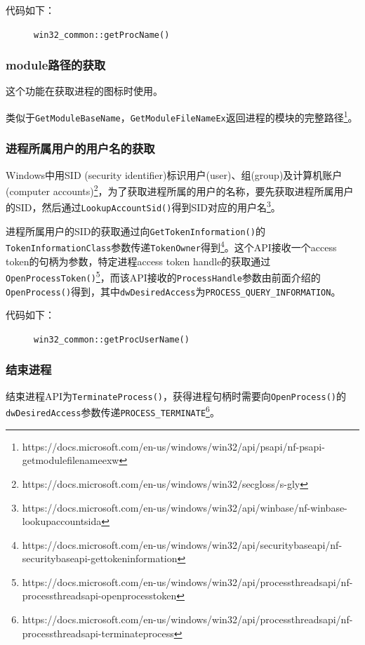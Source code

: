 \documentclass[UTF8,twoside,titlepage]{ctexart}
\newcommand\code[1]{\texttt{#1}}
\begin{document}
代码如下：

\begin{figure}[H]
    \ttfamily
    
    \caption{\code{win32\_common::getProcName()}}
\end{figure}

\subsubsection{module路径的获取}
这个功能在获取进程的图标时使用。

类似于\code{GetModuleBaseName}，\code{GetModuleFileNameEx}返回进程的模块的完整路径\footnote{https://docs.microsoft.com/en-us/windows/win32/api/psapi/nf-psapi-getmodulefilenameexw}。

\subsubsection{进程所属用户的用户名的获取}
Windows中用SID (security identifier)标识用户(user)、组(group)及计算机账户(computer accounts)\footnote{https://docs.microsoft.com/en-us/windows/win32/secgloss/s-gly}，为了获取进程所属的用户的名称，要先获取进程所属用户的SID，然后通过\code{LookupAccountSid()}得到SID对应的用户名\footnote{https://docs.microsoft.com/en-us/windows/win32/api/winbase/nf-winbase-lookupaccountsida}。

进程所属用户的SID的获取通过向\code{GetTokenInformation()}的\code{TokenInformationClass}参数传递\code{TokenOwner}得到\footnote{https://docs.microsoft.com/en-us/windows/win32/api/securitybaseapi/nf-securitybaseapi-gettokeninformation}。这个API接收一个access token的句柄为参数，特定进程access token handle的获取通过\code{OpenProcessToken()}\footnote{https://docs.microsoft.com/en-us/windows/win32/api/processthreadsapi/nf-processthreadsapi-openprocesstoken}，而该API接收的\code{ProcessHandle}参数由前面介绍的\code{OpenProcess()}得到，其中\code{dwDesiredAccess}为\code{PROCESS\_QUERY\_INFORMATION}。

代码如下：

\begin{figure}[H]
    \ttfamily
    
    \caption{\code{win32\_common::getProcUserName()}}
\end{figure}

\subsubsection{结束进程}
结束进程API为\code{TerminateProcess()}，获得进程句柄时需要向\code{OpenProcess()}的\code{dwDesiredAccess}参数传递\code{PROCESS\_TERMINATE}\footnote{https://docs.microsoft.com/en-us/windows/win32/api/processthreadsapi/nf-processthreadsapi-terminateprocess}。
\end{document}
